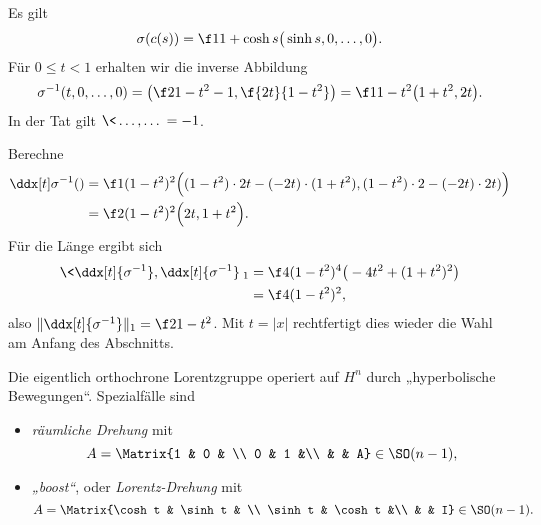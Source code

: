 Es gilt
\[
	\sigma(c(s)) = \f 1{1 + \cosh s} \big( \sinh s, 0, \dots, 0 \big).
\]
Für $0 \le t < 1$ erhalten wir die inverse Abbildung
\[
	\sigma^{-1}(t, 0, \dotsc, 0)
	= \big( \f 2{1 - t^2} - 1, \f {2t}{1-t^2} \big)
	= \f 1{1-t^2} \big( 1 + t^2, 2t \big).
\]
In der Tat gilt $\< \dotsc, \dotsc \> = -1$.

Berechne
\begin{align*}
	\ddx[t] \sigma^{-1}()
	&= \f 1{(1-t^2)^2} \Big( (1-t^2) \cdot 2t - (-2t)\cdot (1 + t^2), (1-t^2) \cdot 2 - (-2t)\cdot 2t) \Big) \\
	&= \f 2{(1-t^2)^2} \Big( 2t, 1 + t^2 \Big).
\end{align*}
Für die Länge ergibt sich
\begin{align*}
	\< \ddx[t]{\sigma^{-1}}, \ddx[t]{\sigma^{-1}} \>_1
	&= \f 4{(1-t^2)^4} \big( - 4t^2 + (1+t^2)^2 \big) \\
	&= \f 4{(1-t^2)^2},
\end{align*}
also $\|\ddx[t]{\sigma^{-1}}\|_1 = \f 2{1-t^2}$.
Mit $t = |x|$ rechtfertigt dies wieder die Wahl am Anfang des Abschnitts.

\begin{nt}
	Die eigentlich orthochrone Lorentzgruppe operiert auf $H^n$ durch „hyperbolische Bewegungen“.
	Spezialfälle sind
	\begin{itemize}
		\item
			\emph{räumliche Drehung} mit
			\[
				A = \Matrix{1 & 0 &  \\ 0 & 1 &\\ & & A} \in \SO(n-1),
			\]
		\item
			\emph{„boost“}, oder \emph{Lorentz-Drehung} mit
			\[
				A = \Matrix{\cosh t & \sinh t &  \\ \sinh t & \cosh t &\\ & & I} \in \SO(n-1).
			\]
	\end{itemize}
\end{nt}




